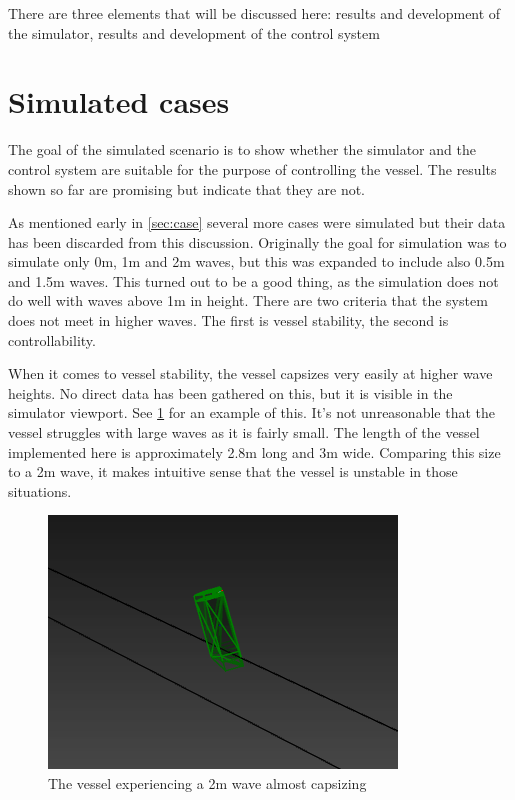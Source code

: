 \documentclass[class=article, crop=false]{standalone}
\begin{document}
There are three elements that will be discussed here: results and development of the simulator, results and development of the control system

\section{Simulated cases}
The goal of the simulated scenario is to show whether the simulator and the control system are suitable for the purpose of controlling the vessel. The results shown so far are promising but indicate that they are not.

As mentioned early in \cref{sec:case} several more cases were simulated but their data has been discarded from this discussion. Originally the goal for simulation was to simulate only 0m, 1m and 2m waves, but this was expanded to include also 0.5m and 1.5m waves. This turned out to be a good thing, as the simulation does not do well with waves above 1m in height. There are two criteria that the system does not meet in higher waves. The first is vessel stability, the second is controllability.

When it comes to vessel stability, the vessel capsizes very easily at higher wave heights. No direct data has been gathered on this, but it is visible in the simulator viewport. See \cref{fig:half_capsized} for an example of this. It's not unreasonable that the vessel struggles with large waves as it is fairly small. The length of the vessel implemented here is approximately 2.8m long and 3m wide. Comparing this size to a 2m wave, it makes intuitive sense that the vessel is unstable in those situations.

\begin{figure}
    \centering
    \includegraphics{2m-wave-half-capsized}
    \caption{The vessel experiencing a 2m wave almost capsizing}
    \label{fig:half_capsized}
\end{figure}
\end{document}
